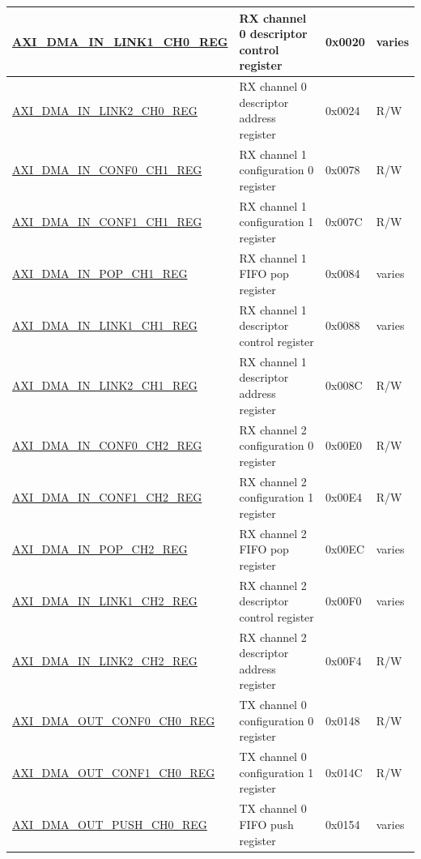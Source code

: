 \begin{longtable}{ | l | p{10cm} | p{1.3cm} | l | }
\hyperref[regdesc:AXIDMAINLINK1CHNREG]{AXI\_DMA\_IN\_LINK1\_CH0\_REG} & RX channel 0 descriptor control register & 0x0020 & varies \\ \hline
\hyperref[regdesc:AXIDMAINLINK2CHNREG]{AXI\_DMA\_IN\_LINK2\_CH0\_REG} & RX channel 0 descriptor address register & 0x0024 & R/W \\ \hline
\hyperref[regdesc:AXIDMAINCONF0CHNREG]{AXI\_DMA\_IN\_CONF0\_CH1\_REG} & RX channel 1 configuration 0 register & 0x0078 & R/W \\ \hline
\hyperref[regdesc:AXIDMAINCONF1CHNREG]{AXI\_DMA\_IN\_CONF1\_CH1\_REG} & RX channel 1 configuration 1 register & 0x007C & R/W \\ \hline
\hyperref[regdesc:AXIDMAINPOPCHNREG]{AXI\_DMA\_IN\_POP\_CH1\_REG} & RX channel 1 FIFO pop register & 0x0084 & varies \\ \hline
\hyperref[regdesc:AXIDMAINLINK1CHNREG]{AXI\_DMA\_IN\_LINK1\_CH1\_REG} & RX channel 1 descriptor control register & 0x0088 & varies \\ \hline
\hyperref[regdesc:AXIDMAINLINK2CHNREG]{AXI\_DMA\_IN\_LINK2\_CH1\_REG} & RX channel 1 descriptor address register & 0x008C & R/W \\ \hline
\hyperref[regdesc:AXIDMAINCONF0CHNREG]{AXI\_DMA\_IN\_CONF0\_CH2\_REG} & RX channel 2 configuration 0 register & 0x00E0 & R/W \\ \hline
\hyperref[regdesc:AXIDMAINCONF1CHNREG]{AXI\_DMA\_IN\_CONF1\_CH2\_REG} & RX channel 2 configuration 1 register & 0x00E4 & R/W \\ \hline
\hyperref[regdesc:AXIDMAINPOPCHNREG]{AXI\_DMA\_IN\_POP\_CH2\_REG} & RX channel 2 FIFO pop register & 0x00EC & varies \\ \hline
\hyperref[regdesc:AXIDMAINLINK1CHNREG]{AXI\_DMA\_IN\_LINK1\_CH2\_REG} & RX channel 2 descriptor control register & 0x00F0 & varies \\ \hline
\hyperref[regdesc:AXIDMAINLINK2CHNREG]{AXI\_DMA\_IN\_LINK2\_CH2\_REG} & RX channel 2 descriptor address register & 0x00F4 & R/W \\ \hline
\hyperref[regdesc:AXIDMAOUTCONF0CHNREG]{AXI\_DMA\_OUT\_CONF0\_CH0\_REG} & TX channel 0 configuration 0 register & 0x0148 & R/W \\ \hline
\hyperref[regdesc:AXIDMAOUTCONF1CHNREG]{AXI\_DMA\_OUT\_CONF1\_CH0\_REG} & TX channel 0 configuration 1 register & 0x014C & R/W \\ \hline
\hyperref[regdesc:AXIDMAOUTPUSHCHNREG]{AXI\_DMA\_OUT\_PUSH\_CH0\_REG} & TX channel 0 FIFO push register & 0x0154 & varies \\ \hline

\end{longtable}
